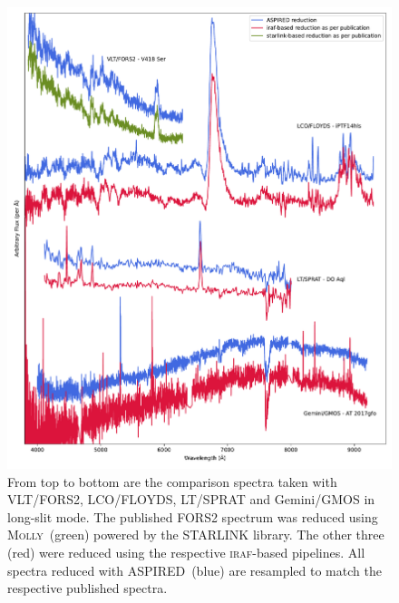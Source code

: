 \documentclass[twocolumn, linenumbers]{aastex631}
\begin{document}
\begin{figure}
    \centering
    \includegraphics[width=\textwidth]{fig_08_reduction_compared.pdf}
    \caption{From top to bottom are the comparison spectra taken with VLT/FORS2,
    LCO/FLOYDS, LT/SPRAT and Gemini/GMOS in long-slit mode. The published FORS2
    spectrum was reduced using \textsc{Molly}~(green) powered by the \textsc{STARLINK}
    library. The other three (red) were reduced using the respective \textsc{iraf}-based
    pipelines. All spectra reduced with \textsc{ASPIRED}~(blue) are resampled to match
    the respective published spectra.}
    \label{fig:reduction_compared}
\end{figure}
\end{document}
